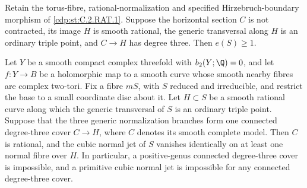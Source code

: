 
\begin{proposition}\hypertarget{tag-01BY}{}\label{cdp:st:C.2.D4.3}


Retain the torus-fibre, rational-normalization and specified
Hirzebruch-boundary morphism of \ref{cdp:st:C.2.RAT.1}. Suppose the horizontal
section $C$ is not contracted, its image $H$ is smooth rational,
the generic transversal along $H$ is an ordinary triple point,
and $C\to H$ has degree three. Then $e(S)\ge1$.
\end{proposition}

\begin{proposition}\hypertarget{tag-01BW}{}\label{cdp:st:C.2.D4.1}


Let $Y$ be a smooth compact complex threefold with
$b_2(Y;\Q)=0$, and let $f:Y\to B$ be a holomorphic map to a
smooth curve whose smooth nearby fibres are complex two-tori.
Fix a fibre $mS$, with $S$ reduced and irreducible, and restrict
the base to a small coordinate disc about it. Let
$H\subset S$ be a smooth rational curve along which the generic
transversal of $S$ is an ordinary triple point. Suppose that the
three generic normalization branches form one connected degree-three
cover $C\to H$, where $C$ denotes its smooth complete model.
Then $C$ is rational, and the cubic normal jet of $S$ vanishes
identically on at least one normal fibre over $H$.
In particular, a positive-genus connected degree-three cover is
impossible, and a primitive cubic normal jet is impossible for
any connected degree-three cover.
\end{proposition}

